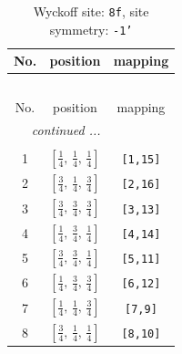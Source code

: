 \documentclass[fleqn,8pt]{jsarticle}
\begin{document}
\begin{longtable}{ccc}
\caption{Wyckoff site: {\tt 8f}, site symmetry: {\tt -1'}}
 \\
 \hline \hline
No. & position & mapping \\ \hline \endfirsthead

\multicolumn{2}{l}{\tablename\ \thetable{}} \\
 \hline \hline
No. & position & mapping \\ \hline \endhead

 \hline \hline
\multicolumn{2}{r}{\footnotesize\it continued ...} \\ \endfoot

 \hline \hline
\multicolumn{2}{r}{} \\ \endlastfoot

1 & $\left[ \frac{1}{4},\, \frac{1}{4},\, \frac{1}{4} \right]$ & {\tt [1,15]} \\ \hline
2 & $\left[ \frac{3}{4},\, \frac{1}{4},\, \frac{3}{4} \right]$ & {\tt [2,16]} \\ \hline
3 & $\left[ \frac{3}{4},\, \frac{3}{4},\, \frac{3}{4} \right]$ & {\tt [3,13]} \\ \hline
4 & $\left[ \frac{1}{4},\, \frac{3}{4},\, \frac{1}{4} \right]$ & {\tt [4,14]} \\ \hline
5 & $\left[ \frac{3}{4},\, \frac{3}{4},\, \frac{1}{4} \right]$ & {\tt [5,11]} \\ \hline
6 & $\left[ \frac{1}{4},\, \frac{3}{4},\, \frac{3}{4} \right]$ & {\tt [6,12]} \\ \hline
7 & $\left[ \frac{1}{4},\, \frac{1}{4},\, \frac{3}{4} \right]$ & {\tt [7,9]} \\ \hline
8 & $\left[ \frac{3}{4},\, \frac{1}{4},\, \frac{1}{4} \right]$ & {\tt [8,10]} \\
\end{longtable}
\renewcommand{\arraystretch}{1.2}
\end{document}
